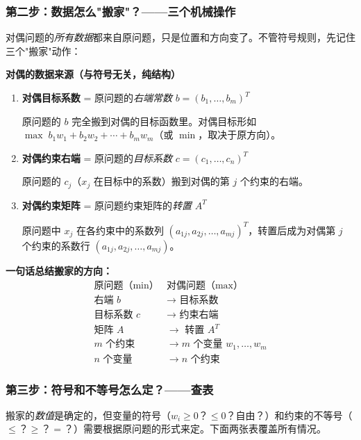 \subsubsection{第二步：数据怎么"搬家"？——三个机械操作}

对偶问题的\emph{所有数据}都来自原问题，只是位置和方向变了。不管符号规则，先记住三个"搬家"动作：

\textbf{对偶的数据来源（与符号无关，纯结构）}

\begin{enumerate}
  \item \textbf{对偶目标系数} = 原问题的\emph{右端常数} $b = (b_1,\dots,b_m)^T$

  原问题的 $b$ 完全搬到对偶的目标函数里。对偶目标形如 $\max\; b_1 w_1 + b_2 w_2 + \cdots + b_m w_m$（或 $\min$，取决于原方向）。

  \item \textbf{对偶约束右端} = 原问题的\emph{目标系数} $c = (c_1,\dots,c_n)^T$

  原问题的 $c_j$（$x_j$ 在目标中的系数）搬到对偶的第 $j$ 个约束的右端。

  \item \textbf{对偶约束矩阵} = 原问题约束矩阵的\emph{转置} $A^T$

  原问题中 $x_j$ 在各约束中的系数列 $(a_{1j},a_{2j},\dots,a_{mj})^T$，转置后成为对偶第 $j$ 个约束的系数行 $(a_{1j},a_{2j},\dots,a_{mj})$。
\end{enumerate}

\textbf{一句话总结搬家的方向：}
\[
\begin{array}{c|c}
\text{原问题（$\min$）} & \text{对偶问题（$\max$）} \\
\hline
\text{右端 } b & \longrightarrow \text{ 目标系数} \\
\text{目标系数 } c & \longrightarrow \text{ 约束右端} \\
\text{矩阵 } A & \longrightarrow \text{ 转置 } A^T \\
m \text{ 个约束} & \longrightarrow m \text{ 个变量 } w_1,\dots,w_m \\
n \text{ 个变量} & \longrightarrow n \text{ 个约束}
\end{array}
\]

\subsubsection{第三步：符号和不等号怎么定？——查表}

搬家的\emph{数值}是确定的，但变量的符号（$w_i \ge 0$？$\le 0$？自由？）和约束的不等号（$\le$？$\ge$？$=$？）需要根据原问题的形式来定。下面两张表覆盖所有情况。

